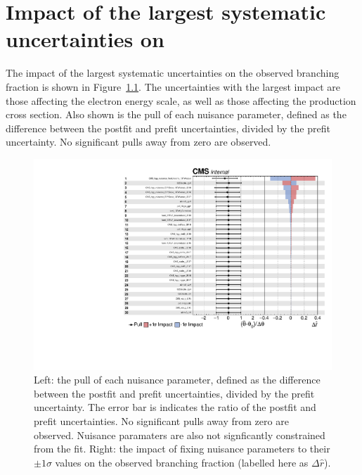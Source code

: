 \chapter{Impact of the largest systematic uncertainties on \BHee}
\label{app:impacts}

The impact of the largest systematic uncertainties on the observed \Hee branching fraction is shown in Figure~\ref{fig:impacts}. The uncertainties with the largest impact are those affecting the electron energy scale, as well as those affecting the \ggH production cross section. Also shown is the pull of each nuisance parameter, defined as the difference between the postfit and prefit uncertainties, divided by the prefit uncertainty. No significant pulls away from zero are observed.

\begin{figure}[htbp!]
\centering
\includegraphics[trim={0cm 0cm 0cm 1cm},clip,width =0.8\linewidth]{Figures/Hee/Results/systs/impacts_pass20_unblinded_dropBkgParams.pdf}\hfill%

\caption[The impact of the top systematic uncertainties on \BHee]{Left: the pull of each nuisance parameter, defined as the difference between the postfit and prefit uncertainties, divided by the prefit uncertainty. The error bar is indicates the ratio of the postfit and prefit uncertainties. No significant pulls away from zero are observed. Nuisance paramaters are also not signficantly constrained from the fit. Right: the impact of fixing nuisance parameters to their $\pm1\sigma$ values on the observed \Hee branching fraction (labelled here as $\Delta \hat{r}$).}
\label{fig:impacts}                                              
\end{figure}
